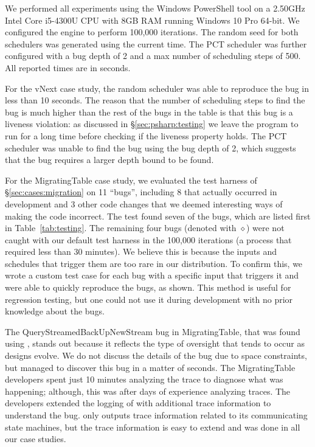 We performed all experiments using the Windows PowerShell tool on a 2.50GHz Intel Core i5-4300U CPU with 8GB RAM running Windows 10 Pro 64-bit. We configured the engine to perform 100,000 iterations. The random seed for both schedulers was generated using the current time. The PCT scheduler was further configured with a bug depth of 2 and a max number of scheduling steps of 500. All reported times are in seconds.

For the vNext case study, the random scheduler was able to reproduce the bug in less than 10 seconds. The reason that the number of scheduling steps to find the bug is much higher than the rest of the bugs in the table is that this bug is a liveness violation: as discussed in \S\ref{sec:psharp:testing} we leave the program to run for a long time before checking if the liveness property holds. The PCT scheduler was unable to find the bug using the bug depth of 2, which suggests that the bug requires a larger depth bound to be found.

For the MigratingTable case study, we evaluated the \psharp test harness of \S\ref{sec:cases:migration} on 11 ``bugs'', including 8 that actually occurred in development and 3 other code changes that we deemed interesting ways of making the code incorrect. The test found seven of the bugs, which are listed first in Table~\ref{tab:testing}. The remaining four bugs (denoted with $\diamond$) were not caught with our default test harness in the 100,000 iterations (a process that required less than 30 minutes). We believe this is because the inputs and schedules that trigger them are too rare in our distribution. To confirm this, we wrote a custom test case for each bug with a specific input that triggers it and were able to quickly reproduce the bugs, as shown. This method is useful for regression testing, but one could not use it during development with no prior knowledge about the bugs.

The QueryStreamedBackUpNewStream bug in MigratingTable, that was found using \psharp, stands out because it reflects the type of oversight that tends to occur as designs evolve. We do not discuss the details of the bug due to space constraints, but \psharp managed to discover this bug in a matter of seconds. The MigratingTable developers spent just 10 minutes analyzing the trace to diagnose what was happening; although, this was after days of experience analyzing traces. The developers extended the logging of \psharp with additional trace information to understand the bug. \psharp only outputs trace information related to its communicating state machines, but the trace information is easy to extend and was done in all our case studies.

